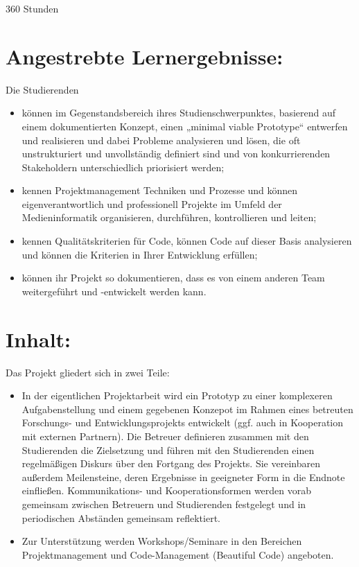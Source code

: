 360 Stunden

\section*{Angestrebte
Lernergebnisse:}\label{angestrebte-lernergebnisse-8}

Die Studierenden

\begin{itemize}
\tightlist
\item
  können im Gegenstandsbereich ihres Studienschwerpunktes, basierend auf
  einem dokumentierten Konzept, einen „minimal viable Prototype``
  entwerfen und realisieren und dabei Probleme analysieren und lösen,
  die oft unstrukturiert und unvollständig definiert sind und von
  konkurrierenden Stakeholdern unterschiedlich priorisiert werden;
\item
  kennen Projektmanagement Techniken und Prozesse und können
  eigenverantwortlich und professionell Projekte im Umfeld der
  Medieninformatik organisieren, durchführen, kontrollieren und leiten;
\item
  kennen Qualitätskriterien für Code, können Code auf dieser Basis
  analysieren und können die Kriterien in Ihrer Entwicklung erfüllen;
\item
  können ihr Projekt so dokumentieren, dass es von einem anderen Team
  weitergeführt und -entwickelt werden kann.
\end{itemize}

\section*{Inhalt:}\label{inhalt-8}

Das Projekt gliedert sich in zwei Teile:

\begin{itemize}
\tightlist
\item
  In der eigentlichen Projektarbeit wird ein Prototyp zu einer
  komplexeren Aufgabenstellung und einem gegebenen Konzepot im Rahmen
  eines betreuten Forschungs- und Entwicklungsprojekts entwickelt (ggf.
  auch in Kooperation mit externen Partnern). Die Betreuer definieren
  zusammen mit den Studierenden die Zielsetzung und führen mit den
  Studierenden einen regelmäßigen Diskurs über den Fortgang des
  Projekts. Sie vereinbaren außerdem Meilensteine, deren Ergebnisse in
  geeigneter Form in die Endnote einfließen. Kommunikations- und
  Kooperationsformen werden vorab gemeinsam zwischen Betreuern und
  Studierenden festgelegt und in periodischen Abständen gemeinsam
  reflektiert.
\item
  Zur Unterstützung werden Workshops/Seminare in den Bereichen
  Projektmanagement und Code-Management (Beautiful Code) angeboten.
\end{itemize}

